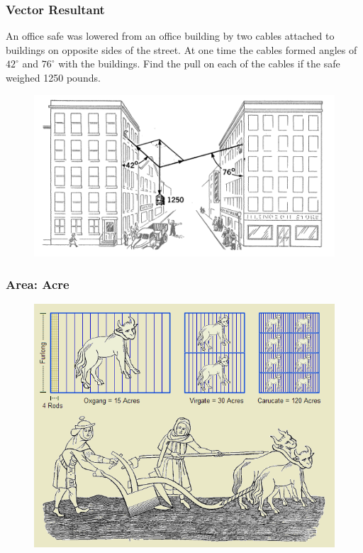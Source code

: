 \documentclass[xcolor=dvipsnames]{beamer}
\begin{document}
\begin{frame}
  \frametitle{Vector Resultant}
  An office safe was lowered from an office building by two cables
  attached to buildings on opposite sides of the street. At one time
  the cables formed angles of $42^{\circ}$ and $76^{\circ}$ with the
  buildings. Find the pull on each of the cables if the safe weighed
  1250 pounds.
  \begin{figure}[h]
    \includegraphics[scale=.55]{./vector-resultant-01.png}
  \end{figure}
\end{frame}

\begin{frame}
  \frametitle{Area: Acre}
  \begin{figure}[h]
    \includegraphics[scale=.45]{./acre.png}
  \end{figure}
\end{frame}
\end{document}
